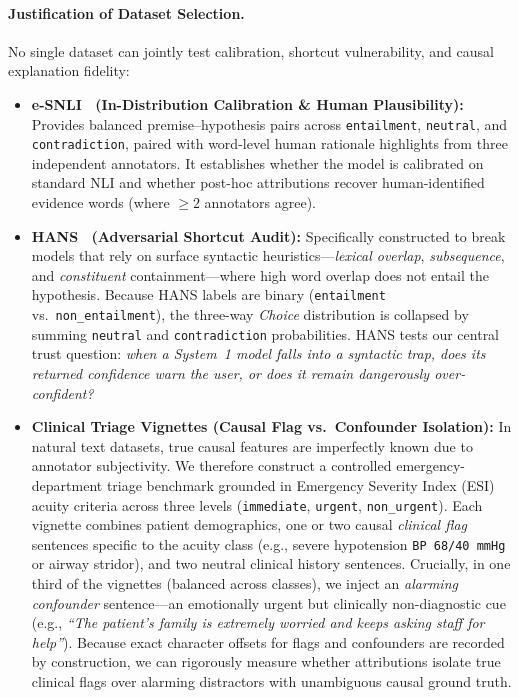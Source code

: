 \documentclass[10pt]{article}
\begin{document}
\paragraph{Justification of Dataset Selection.}
No single dataset can jointly test calibration, shortcut vulnerability, and causal explanation fidelity:
\begin{itemize}
\item \textbf{e-SNLI~\cite{bowman2015,camburu2018} (In-Distribution Calibration \& Human Plausibility):} Provides balanced premise--hypothesis pairs across \texttt{entailment}, \texttt{neutral}, and \texttt{contradiction}, paired with word-level human rationale highlights from three independent annotators. It establishes whether the model is calibrated on standard NLI and whether post-hoc attributions recover human-identified evidence words (where $\ge 2$ annotators agree).
\item \textbf{HANS~\cite{mccoy2019} (Adversarial Shortcut Audit):} Specifically constructed to break models that rely on surface syntactic heuristics---\emph{lexical overlap}, \emph{subsequence}, and \emph{constituent} containment---where high word overlap does not entail the hypothesis. Because HANS labels are binary (\texttt{entailment} vs.\ \texttt{non\_entailment}), the three-way \emph{Choice} distribution is collapsed by summing \texttt{neutral} and \texttt{contradiction} probabilities. HANS tests our central trust question: \emph{when a System~1 model falls into a syntactic trap, does its returned confidence warn the user, or does it remain dangerously over-confident?}
\item \textbf{Clinical Triage Vignettes (Causal Flag vs.\ Confounder Isolation):} In natural text datasets, true causal features are imperfectly known due to annotator subjectivity. We therefore construct a controlled emergency-department triage benchmark grounded in Emergency Severity Index (ESI) acuity criteria across three levels (\texttt{immediate}, \texttt{urgent}, \texttt{non\_urgent}). Each vignette combines patient demographics, one or two causal \emph{clinical flag} sentences specific to the acuity class (e.g., severe hypotension \texttt{BP 68/40 mmHg} or airway stridor), and two neutral clinical history sentences. Crucially, in one third of the vignettes (balanced across classes), we inject an \emph{alarming confounder} sentence---an emotionally urgent but clinically non-diagnostic cue (e.g., \emph{``The patient's family is extremely worried and keeps asking staff for help''}). Because exact character offsets for flags and confounders are recorded by construction, we can rigorously measure whether attributions isolate true clinical flags over alarming distractors with unambiguous causal ground truth.

\end{itemize}
\end{document}
